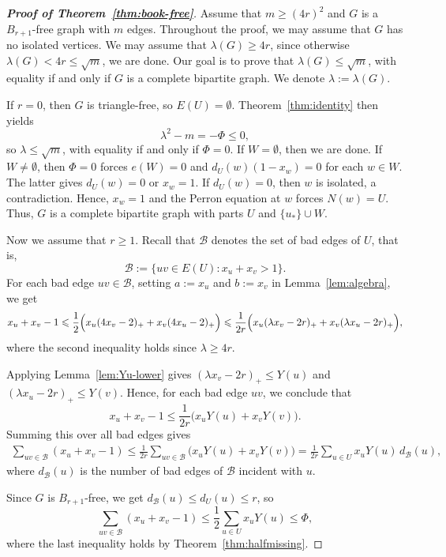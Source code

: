 \documentclass[10pt,a4paper]{amsart}
\renewcommand{\le}{\leqslant}
\renewcommand{\ge}{\geqslant}
\begin{document}
\begin{proof}[{\bf Proof of Theorem~\ref{thm:book-free}}]
Assume that $m\ge (4r)^2$ and $G$ is a $B_{r+1}$-free graph with $m$ edges. Throughout the proof, we may assume that $G$ has no isolated vertices. 
We may assume that $\lambda (G)\ge 4r$, since otherwise $\lambda(G)< 4r\le \sqrt{m}$, we are done. 
Our goal is to prove that $\lambda(G)\le \sqrt{m}$, with equality if and only if $G$ is a complete bipartite graph. We denote $\lambda :=\lambda (G)$. 

If $r=0$, then $G$ is triangle-free, so $E(U)=\emptyset$. 
Theorem~\ref{thm:identity} then yields 
\[ \lambda^2-m=-\Phi\le 0, \] 
so $\lambda \le \sqrt{m}$, with equality if and only if $\Phi =0$. 
If $W=\emptyset$, then we are done. 
If $W\neq \emptyset$, then $\Phi =0$ forces $e(W)=0$ and $d_U(w)(1-x_w)=0$ for each $w\in W$. The latter gives $d_U(w)=0$ or $x_w=1$.
If $d_U(w)=0$, then $w$ is isolated, a contradiction. 
Hence, $x_w=1$ and the Perron equation at $w$ forces $N(w)=U$.  
Thus, $G$ is a complete bipartite graph with parts $U$ and $\{u_*\}\cup W$.  

Now we assume that $r\ge 1$. 
Recall that $\mathcal{B}$ denotes the set of bad edges of $U$, that is,
\[
\mathcal{B}:=\{uv\in E(U):x_u+x_v>1\}.
\]
For each bad edge $uv\in\mathcal{B}$, setting $a:=x_u$ and $b:=x_v$ in Lemma~\ref{lem:algebra}, we get 
\begin{equation} \label{eq-after-4-4}
x_u + x_v-1 
\le
\frac12\Bigl(x_u(4x_v-2)_+ + x_v(4x_u-2)_+\Bigr) 
\le \frac{1}{2r} \Big( x_u(\lambda x_v-2r)_+ + x_v(\lambda x_u-2r)_+\Big),
\end{equation}
where the second inequality holds since $\lambda \ge 4r$. 


Applying Lemma~\ref{lem:Yu-lower} gives 
$(\lambda x_v-2r)_+\le Y(u)$ and $(\lambda x_u -2r)_+\le Y(v)$. 
Hence, for each bad edge $uv$, we conclude that 
\[
x_u+x_v-1\le \frac{1}{2r}\Big( x_uY(u)+x_vY(v) \Big).
\]
Summing this over all bad edges gives
\begin{align*}
\sum_{uv\in \mathcal{B}}(x_u+x_v-1)
\le \frac1{2r}\sum_{uv\in \mathcal{B}}\bigl(x_uY(u)+x_vY(v)\bigr) 
=\frac1{2r}\sum_{u\in U}x_uY(u)\,d_{\mathcal{B}}(u),
\end{align*}
where $d_{\mathcal{B}}(u)$ is the number of bad edges of $\mathcal{B}$ incident with $u$. 

Since $G$ is $B_{r+1}$-free, we get $d_{\mathcal{B}}(u)\le d_U(u)\le r$, so 
\[
\sum_{uv\in \mathcal{B}}(x_u+x_v-1)
\le
\frac12\sum_{u\in U}x_uY(u) \le \Phi,
\]
where the last inequality holds by  Theorem~\ref{thm:halfmissing}. 



\end{proof}
\end{document}

